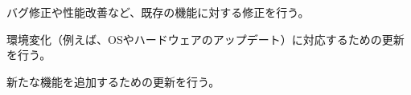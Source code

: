 バグ修正や性能改善など、既存の機能に対する修正を行う。



環境変化（例えば、OSやハードウェアのアップデート）に対応するための更新を行う。



新たな機能を追加するための更新を行う。




\begin{appendices}

\end{appendices}
